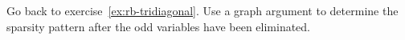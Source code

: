   Go back to exercise~\ref{ex:rb-tridiagonal}. Use a graph argument to
  determine the sparsity pattern after the odd variables have been
  eliminated.
